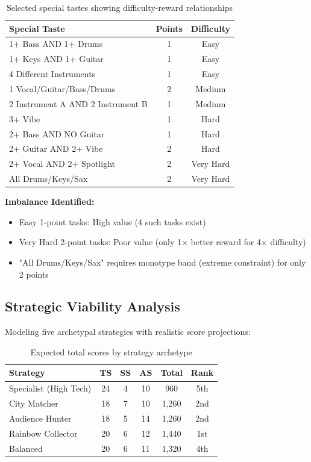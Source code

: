 \documentclass[11pt,a4paper]{article}
\begin{document}
\begin{table}[H]
\centering
\small
\begin{tabular}{p{4.5cm}cc}
\toprule
\textbf{Special Taste} & \textbf{Points} & \textbf{Difficulty} \\
\midrule
1+ Bass AND 1+ Drums & 1 & Easy \\
1+ Keys AND 1+ Guitar & 1 & Easy \\
4 Different Instruments & 1 & Easy \\
1 Vocal/Guitar/Bass/Drums & 2 & Medium \\
2 Instrument A AND 2 Instrument B & 1 & Medium \\
3+ Vibe & 1 & Hard \\
2+ Bass AND NO Guitar & 1 & Hard \\
2+ Guitar AND 2+ Vibe & 2 & Hard \\
2+ Vocal AND 2+ Spotlight & 2 & Very Hard \\
All Drums/Keys/Sax & 2 & Very Hard \\
\bottomrule
\end{tabular}
\caption{Selected special tastes showing difficulty-reward relationships}
\end{table}

\textbf{Imbalance Identified:}
\begin{itemize}[itemsep=0pt]
    \item Easy 1-point tasks: High value (4 such tasks exist)
    \item Very Hard 2-point tasks: Poor value (only 1$\times$ better reward for 4$\times$ difficulty)
    \item "All Drums/Keys/Sax" requires monotype band (extreme constraint) for only 2 points
\end{itemize}

\subsection{Strategic Viability Analysis}

Modeling five archetypal strategies with realistic score projections:

\begin{table}[H]
\centering
\small
\begin{tabular}{lccccc}
\toprule
\textbf{Strategy} & \textbf{TS} & \textbf{SS} & \textbf{AS} & \textbf{Total} & \textbf{Rank} \\
\midrule
Specialist (High Tech) & 24 & 4 & 10 & 960 & 5th \\
City Matcher & 18 & 7 & 10 & 1,260 & 2nd \\
Audience Hunter & 18 & 5 & 14 & 1,260 & 2nd \\
Rainbow Collector & 20 & 6 & 12 & 1,440 & 1st \\
Balanced & 20 & 6 & 11 & 1,320 & 4th \\
\bottomrule
\end{tabular}
\caption{Expected total scores by strategy archetype}
\end{table}
\end{document}

